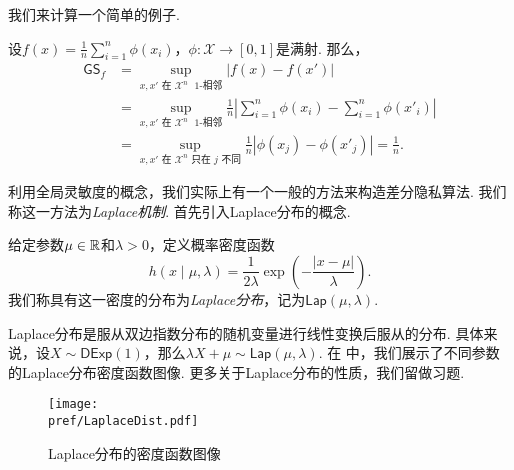 我们来计算一个简单的例子.
\begin{example}
设$f(x)= \frac1n \sum_{i=1}^n \phi(x_i)$，$\phi : \mathcal X\to [0,1]$是满射. 那么，
\begin{align*}
    \mathsf{GS}_f&=\sup_{x, x' \text{ 在 }\mathcal X^n\text{ $1$-相邻}} |f(x) - f(x')|\\
    &= \sup_{x, x' \text{ 在 }\mathcal X^n\text{ $1$-相邻}} \frac1n \left|\sum_{i=1}^n \phi(x_i) - \sum_{i=1}^n \phi(x'_i)\right|\\
    &= \sup_{x, x' \text{ 在 }\mathcal X^n\text{ 只在 } j\text{ 不同}} \frac1n \left|\phi(x_j) - \phi(x'_j)\right| = \frac1n.
\end{align*}
\end{example}

利用全局灵敏度的概念，我们实际上有一个一般的方法来构造差分隐私算法. 我们称这一方法为\emph{Laplace机制}. 首先引入Laplace分布的概念.

\begin{definition}[Laplace分布]
    给定参数$\mu\in\mathbb{R}$和$\lambda>0$，定义概率密度函数
        \[h(x \mid \mu, \lambda) = \frac1{2\lambda}\exp\left(- \frac{|x - \mu|}{\lambda}\right).\]
我们称具有这一密度的分布为\emph{Laplace分布}，记为$\mathsf{Lap}(\mu,\lambda)$.
\end{definition}

Laplace分布是服从双边指数分布的随机变量进行线性变换后服从的分布. 具体来说，设$X\sim\mathsf{DExp}(1)$，那么$\lambda X+\mu\sim\mathsf{Lap}(\mu,\lambda)$. 在 中，我们展示了不同参数的Laplace分布密度函数图像. 更多关于Laplace分布的性质，我们留做习题. 

\begin{figure}[ht]
    \centering
    \texttt{[image: \\pref/LaplaceDist.pdf]}
    
    \caption{Laplace分布的密度函数图像}
    \label{fig:Laplace-distribution}
\end{figure}

